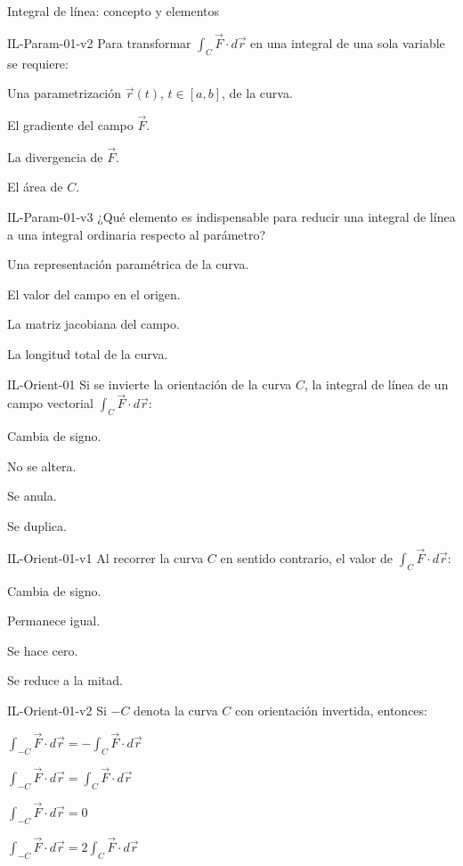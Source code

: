 \documentclass[a4,11pt]{aleph-notas}
\begin{document}
\begin{quiz}{Integral de línea: concepto y elementos}
\begin{multi}[]%
    {IL-Param-01-v2}
    Para transformar $\displaystyle\int_C \vec{F}\cdot d\vec{r}$ en una integral de una sola variable se requiere:
    \item* Una parametrización $\vec{r}(t)$, $t\in[a,b]$, de la curva.
    \item El gradiente del campo $\vec{F}$.
    \item La divergencia de $\vec{F}$.
    \item El área de $C$.
\end{multi}

\begin{multi}[]%
    {IL-Param-01-v3}
    ¿Qué elemento es indispensable para reducir una integral de línea a una integral ordinaria respecto al parámetro?
    \item* Una representación paramétrica de la curva.
    \item El valor del campo en el origen.
    \item La matriz jacobiana del campo.
    \item La longitud total de la curva.
\end{multi}

\begin{multi}[]%
    {IL-Orient-01}
    Si se invierte la orientación de la curva $C$, la integral de línea de un campo vectorial $\displaystyle\int_C \vec{F}\cdot d\vec{r}$:
    \item* Cambia de signo.
    \item No se altera.
    \item Se anula.
    \item Se duplica.
\end{multi}

\begin{multi}[]%
    {IL-Orient-01-v1}
    Al recorrer la curva $C$ en sentido contrario, el valor de $\displaystyle\int_C \vec{F}\cdot d\vec{r}$:
    \item* Cambia de signo.
    \item Permanece igual.
    \item Se hace cero.
    \item Se reduce a la mitad.
\end{multi}

\begin{multi}[]%
    {IL-Orient-01-v2}
    Si $-C$ denota la curva $C$ con orientación invertida, entonces:
    \item* $\displaystyle\int_{-C} \vec{F}\cdot d\vec{r} = -\int_{C} \vec{F}\cdot d\vec{r}$
    \item $\displaystyle\int_{-C} \vec{F}\cdot d\vec{r} = \int_{C} \vec{F}\cdot d\vec{r}$
    \item $\displaystyle\int_{-C} \vec{F}\cdot d\vec{r} = 0$
    \item $\displaystyle\int_{-C} \vec{F}\cdot d\vec{r} = 2\int_{C} \vec{F}\cdot d\vec{r}$
\end{multi}


\end{quiz}
\end{document}
